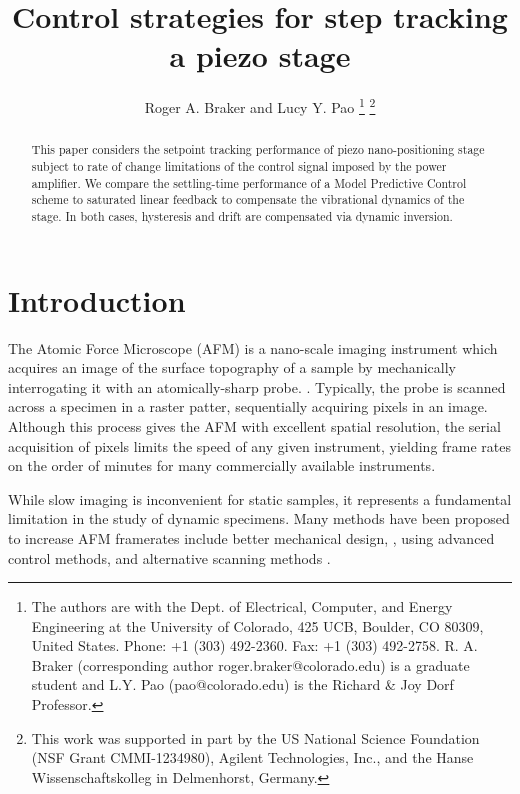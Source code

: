 \documentclass[twocolumn,twoside]{IEEEtran}
\begin{document}
\title{Control strategies for step tracking a piezo stage}
\author{Roger A. Braker and Lucy Y. Pao
  \thanks{The authors are with the Dept. of Electrical, Computer, and Energy Engineering at the University of Colorado, 425 UCB, Boulder, CO 80309, United States. Phone: +1 (303) 492-2360. Fax: +1 (303) 492-2758.
    R. A.  Braker (corresponding author roger.braker@colorado.edu) is a graduate student and
    L.Y. Pao (pao@colorado.edu) is the Richard \& Joy Dorf Professor.}
  \thanks{This work was supported in part by the US National Science Foundation (NSF Grant CMMI-1234980), Agilent Technologies, Inc., and the Hanse Wissenschaftskolleg in Delmenhorst, Germany.}
}

\maketitle
\begin{abstract}
  This paper considers the setpoint tracking performance of piezo nano-positioning stage subject to rate of change limitations of the control signal imposed by the power amplifier. We compare the settling-time performance of a Model Predictive Control scheme to saturated linear feedback to compensate the vibrational dynamics of the stage. In both cases, hysteresis and drift are compensated via dynamic inversion. 
\end{abstract}


\section{Introduction}\label{sec:intro}

The Atomic Force Microscope (AFM) is a nano-scale imaging instrument which acquires an image of the surface topography of a sample by mechanically interrogating it with an atomically-sharp probe.  \cite{abramovitch_tutorial_2007}. Typically, the probe is scanned across a specimen in a raster patter, sequentially acquiring pixels in an image. Although this process gives the AFM with excellent spatial resolution, the serial acquisition of pixels limits the speed of any given instrument, yielding frame rates on the order of minutes for many commercially available instruments.

While slow imaging is inconvenient for static samples, it represents a fundamental limitation in the study of dynamic specimens. Many methods have been proposed to increase AFM framerates include better mechanical design, \cite{schitter_designmodeling,kenton_threeaxis}, using advanced control methods,  \cite{butterworth_dualadaptive_2011, li_feedforward_2007, Leang_IEEECS_2009, reza_zaxis_videorate} and alternative scanning methods \cite{Mahmood_nano_2009,Tuma:2012hv,rana_spiral_2014,fleming_bridging_2010, Huang:2014dw,Hartman:2017ud}.
\end{document}
